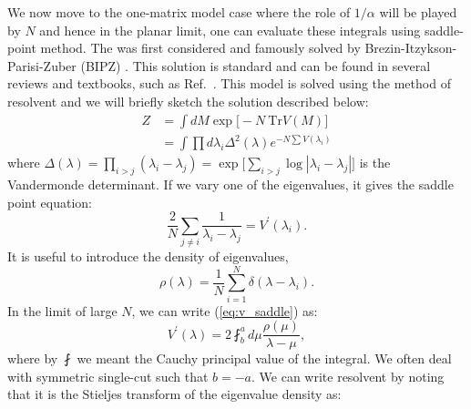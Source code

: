 \documentclass[letter,11pt]{article}
\begin{document}
We now move to the one-matrix model case where the role of $1/\alpha$ will be played by $N$ and hence in the planar limit, one can evaluate these integrals using saddle-point method. The was first considered and famously solved by Brezin-Itzykson-Parisi-Zuber (BIPZ) \cite{Brezin:1977sv}. This solution is standard and can be found in several reviews and textbooks, such as Ref.~\cite{DiFrancesco:1993cyw, Marino:2004eq, 2002mcgt.book.....M}. This model is solved using the method of resolvent
and we will briefly sketch the solution described below:
\begin{align}
	Z &= \int dM \exp\Big[-N~\mbox{Tr} V(M)\Big] \\
	& = \int \prod d\lambda_{i} \Delta^2(\lambda)  e^{-N \sum V(\lambda_i)} 
\end{align}
where $\Delta(\lambda) = \prod_{i > j} (\lambda_i - \lambda_j) = \exp\Big[\sum_{i>j} \log |\lambda_{i} - \lambda_{j}|\Big]$ is the Vandermonde 
determinant. If we vary one of the eigenvalues, it gives the saddle point equation:
\begin{equation}
	\label{eq:v_saddle}
	\frac{2}{N} \sum_{j \neq i} \frac{1}{\lambda_i - \lambda_j} = V^{\prime}(\lambda_i).
\end{equation}
It is useful to introduce the density of eigenvalues,
\begin{equation}
	\rho(\lambda) = \frac{1}{N} \sum_{i=1}^{N} \delta(\lambda - \lambda_i). 
\end{equation}
In the limit of large $N$, we can write (\ref{eq:v_saddle})
as:
\begin{equation}
	\label{eq:vprime}
	V^{\prime}(\lambda) = 2 \fint_{b}^{a} d\mu \frac{\rho(\mu)}{\lambda - \mu}, 
\end{equation}
where by $\fint$ we meant the Cauchy principal value of the integral. We 
often deal with symmetric single-cut such that $b=-a$. 
We can write resolvent by noting that it is the Stieljes transform of the eigenvalue density as: 
\end{document}
